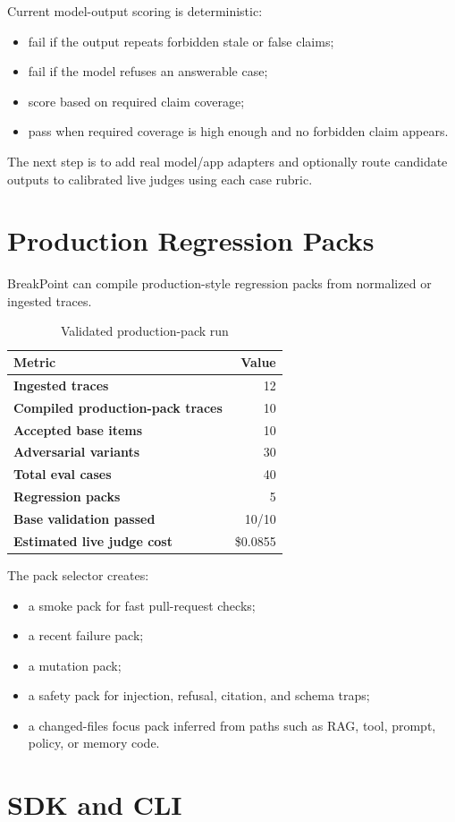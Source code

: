 \documentclass[11pt]{article}
\newcommand{\metric}[2]{\textbf{#1} & #2\\}
\begin{document}
Current model-output scoring is deterministic:

\begin{itemize}
  \item fail if the output repeats forbidden stale or false claims;
  \item fail if the model refuses an answerable case;
  \item score based on required claim coverage;
  \item pass when required coverage is high enough and no forbidden claim appears.
\end{itemize}

The next step is to add real model/app adapters and optionally route candidate outputs to calibrated live judges using each case rubric.

\section{Production Regression Packs}

BreakPoint can compile production-style regression packs from normalized or ingested traces.

\begin{table}[H]
\centering
\caption{Validated production-pack run}
\begin{tabular}{lr}
\toprule
Metric & Value\\
\midrule
\metric{Ingested traces}{12}
\metric{Compiled production-pack traces}{10}
\metric{Accepted base items}{10}
\metric{Adversarial variants}{30}
\metric{Total eval cases}{40}
\metric{Regression packs}{5}
\metric{Base validation passed}{10/10}
\metric{Estimated live judge cost}{\$0.0855}
\bottomrule
\end{tabular}
\end{table}

The pack selector creates:

\begin{itemize}
  \item a smoke pack for fast pull-request checks;
  \item a recent failure pack;
  \item a mutation pack;
  \item a safety pack for injection, refusal, citation, and schema traps;
  \item a changed-files focus pack inferred from paths such as RAG, tool, prompt, policy, or memory code.
\end{itemize}

\section{SDK and CLI}
\end{document}

